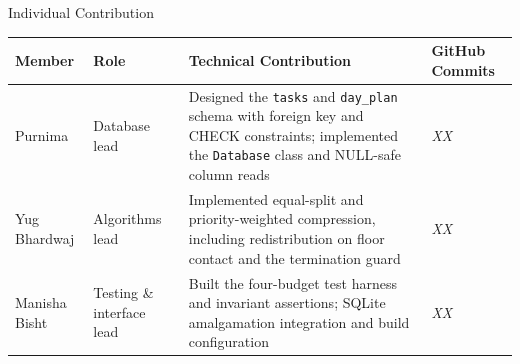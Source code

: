 \documentclass[aspectratio=169,11pt]{beamer}
\newcommand{\placeholder}[1]{%
\textit{\color{GEUGrey}#1}
}
\begin{document}
\begin{frame}{Individual Contribution}

\scriptsize

\begin{center}

\renewcommand{\arraystretch}{1.35}

\begin{tabularx}{.96\textwidth}
{@{}p{2.4cm}p{2.0cm}X p{1.3cm}@{}}

\toprule
Member &
Role &
Technical Contribution &
GitHub Commits\\
\midrule

Purnima &
Database lead &
Designed the \texttt{tasks} and \texttt{day\_plan} schema with foreign key
and CHECK constraints; implemented the \texttt{Database} class and NULL-safe
column reads &
\placeholder{XX}\\

Yug Bhardwaj &
Algorithms lead &
Implemented equal-split and priority-weighted compression, including
redistribution on floor contact and the termination guard &
\placeholder{XX}\\

Manisha Bisht &
Testing \& interface lead &
Built the four-budget test harness and invariant assertions; SQLite
amalgamation integration and build configuration &
\placeholder{XX}\\

\bottomrule

\end{tabularx}

\end{center}

\vspace{3mm}


\end{frame}
\end{document}
